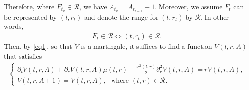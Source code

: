 \documentclass[onefignum,onetabnum]{siamart190516}
\numberwithin{equation}{section}
\newcommand{\scrR}{\mathscr{R}}
\newcommand{\1}{\mathds{1}}
\newcommand{\calR}{\mathcal{R}}
\newcommand{\Vt}{\tilde{V}}
\begin{document}
Therefore, where $F_{t_k} \in \calR$, we have $A_{t_{k}} =
A_{t_{k-1}}+1$. Moreover, we assume $F_t$ can be represented by $(t, r_t)$ and
denote the range for $(t, r_t)$ by $\scrR$. In other words,
\begin{align}
  F_{t}\in \calR \Leftrightarrow (t, r_{t}) \in \scrR.
\end{align}
Then, by \cref{eq1}, so that $\Vt$ is a martingale, it suffices to find a
function $V(t, r, A)$ that satisfies
\begin{align}
\begin{cases}
 \partial_tV(t, r, A)  +\partial_rV(t, r, A)\mu(t, r)
 +\frac{\sigma^2(t, r)}{2}\partial^2_rV(t, r, A)=rV(t, r, A), \\
 V(t, r, A+1) = V(t, r, A), ~~~\text{where } (t, r) \in \scrR.
\end{cases}
\end{align}


\end{document}
